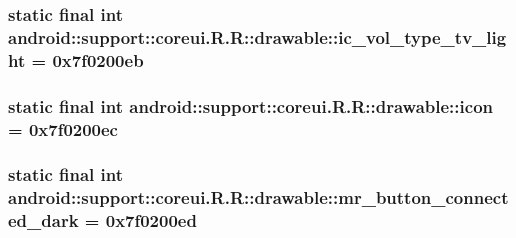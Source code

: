 \hypertarget{classandroid_1_1support_1_1coreui_1_1_r_1_1drawable_2b3fd8c535212a3e864917e90cb72dbb}{
\subsubsection[{ic\_\-vol\_\-type\_\-tv\_\-light}]{\setlength{\rightskip}{0pt plus 5cm}static final int android::support::coreui.R.R::drawable::ic\_\-vol\_\-type\_\-tv\_\-light = 0x7f0200eb}}
\label{classandroid_1_1support_1_1coreui_1_1_r_1_1drawable_2b3fd8c535212a3e864917e90cb72dbb}


\hypertarget{classandroid_1_1support_1_1coreui_1_1_r_1_1drawable_bcc9c9561d609aad25157d362ba52fea}{
\subsubsection[{icon}]{\setlength{\rightskip}{0pt plus 5cm}static final int android::support::coreui.R.R::drawable::icon = 0x7f0200ec}}
\label{classandroid_1_1support_1_1coreui_1_1_r_1_1drawable_bcc9c9561d609aad25157d362ba52fea}


\hypertarget{classandroid_1_1support_1_1coreui_1_1_r_1_1drawable_939e37e9a56fab42c3e94094859081cb}{
\subsubsection[{mr\_\-button\_\-connected\_\-dark}]{\setlength{\rightskip}{0pt plus 5cm}static final int android::support::coreui.R.R::drawable::mr\_\-button\_\-connected\_\-dark = 0x7f0200ed}}
\label{classandroid_1_1support_1_1coreui_1_1_r_1_1drawable_939e37e9a56fab42c3e94094859081cb}


